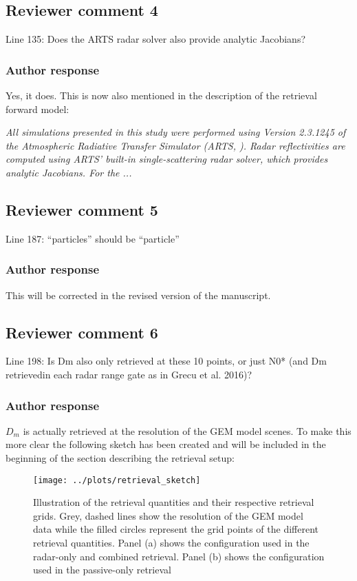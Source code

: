 \documentclass[11pt]{scrartcl}
\begin{document}
\subsection*{Reviewer comment 4}
Line 135: Does the ARTS radar solver also provide analytic Jacobians?

\subsubsection*{Author response}
Yes, it does. This is now also mentioned in the description of the retrieval forward model:

\textit{
All simulations presented in this study were performed using Version 2.3.1245 of
the Atmospheric Radiative Transfer Simulator (ARTS, \cite{arts18}). Radar
reflectivities are computed using ARTS' built-in single-scattering radar solver,
which provides analytic Jacobians. For the ...
}

\subsection*{Reviewer comment 5}
Line 187: “particles” should be “particle”

\subsubsection*{Author response}

This will be corrected in the revised version of the manuscript.


\subsection{Reviewer comment 6}
Line 198: Is Dm also only retrieved at these 10 points, or just N0* (and Dm retrievedin each radar range gate as in Grecu et al. 2016)?

\subsubsection*{Author response}

$D_m$ is actually retrieved at the resolution of the GEM model scenes. To make this more clear
the following sketch has been created and will be included in the beginning of the section
describing the retrieval setup:

\begin{figure}
\centering
\texttt{[image: ../plots/retrieval\_sketch]}
\caption{Illustration of the retrieval quantities and their respective retrieval
  grids. Grey, dashed lines show the resolution of the GEM model data while the
  filled circles represent the grid points of the different retrieval
  quantities. Panel (a) shows the configuration used in the radar-only and
  combined retrieval. Panel (b) shows the configuration used in the passive-only
  retrieval}
\label{fig:retrieval_sketch}
\end{figure}
\end{document}
